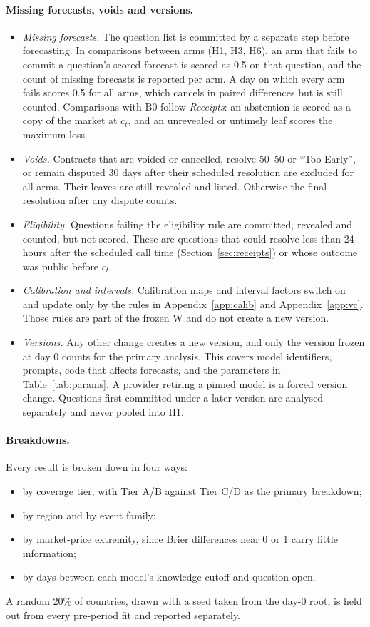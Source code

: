 \documentclass[11pt]{article}
\begin{document}
\paragraph{Missing forecasts, voids and versions.}
\begin{itemize}
  \item \emph{Missing forecasts.} The question list is committed by a separate step before forecasting. In comparisons between arms (H1, H3, H6), an arm that fails to commit a question's scored forecast is scored as 0.5 on that question, and the count of missing forecasts is reported per arm. A day on which every arm fails scores 0.5 for all arms, which cancels in paired differences but is still counted. Comparisons with B0 follow \emph{Receipts}: an abstention is scored as a copy of the market at $c_t$, and an unrevealed or untimely leaf scores the maximum loss.
  \item \emph{Voids.} Contracts that are voided or cancelled, resolve 50--50 or ``Too Early'', or remain disputed 30 days after their scheduled resolution are excluded for all arms. Their leaves are still revealed and listed. Otherwise the final resolution after any dispute counts.
  \item \emph{Eligibility.} Questions failing the eligibility rule are committed, revealed and counted, but not scored. These are questions that could resolve less than 24 hours after the scheduled call time (Section~\ref{sec:receipts}) or whose outcome was public before $c_t$.
  \item \emph{Calibration and intervals.} Calibration maps and interval factors switch on and update only by the rules in Appendix~\ref{app:calib} and Appendix~\ref{app:vc}. Those rules are part of the frozen W and do not create a new version.
  \item \emph{Versions.} Any other change creates a new version, and only the version frozen at day 0 counts for the primary analysis. This covers model identifiers, prompts, code that affects forecasts, and the parameters in Table~\ref{tab:params}. A provider retiring a pinned model is a forced version change. Questions first committed under a later version are analysed separately and never pooled into H1.
\end{itemize}

\paragraph{Breakdowns.} Every result is broken down in four ways:
\begin{itemize}
  \item by coverage tier, with Tier A/B against Tier C/D as the primary breakdown;
  \item by region and by event family;
  \item by market-price extremity, since Brier differences near 0 or 1 carry little information;
  \item by days between each model's knowledge cutoff and question open.
\end{itemize}
A random 20\% of countries, drawn with a seed taken from the day-0 root, is held out from every pre-period fit and reported separately.
\end{document}
